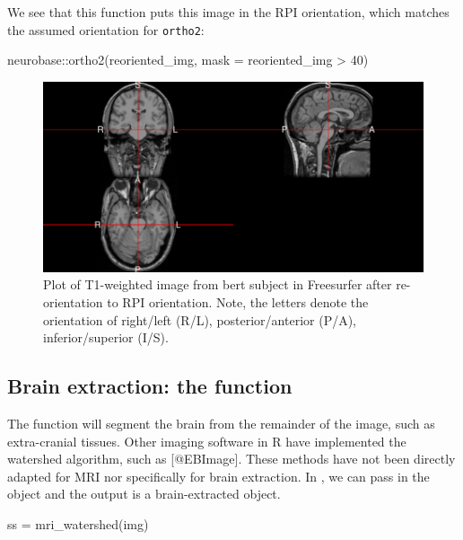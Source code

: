 We see that this function puts this image in the RPI orientation, which
matches the assumed orientation for \texttt{ortho2}:

\begin{Schunk}
\begin{Sinput}
neurobase::ortho2(reoriented_img, mask = reoriented_img > 40)
\end{Sinput}
\begin{figure}
\includegraphics{Freesurfer_files/figure-latex/mri_plot2-1} \caption[Plot of T1-weighted image from bert subject in Freesurfer after re-orientation to RPI orientation]{Plot of T1-weighted image from bert subject in Freesurfer after re-orientation to RPI orientation.  Note, the letters denote the orientation of right/left (R/L), posterior/anterior (P/A), inferior/superior (I/S). }\label{fig:mri_plot2}
\end{figure}
\end{Schunk}

\subsection{\texorpdfstring{Brain extraction: the 
function}{Brain extraction: the  function}}\label{brain-extraction-the-function}

The  function will segment the brain from the
remainder of the image, such as extra-cranial tissues. Other imaging
software in R have implemented the watershed algorithm, such as
 {[}@EBImage{]}. These methods have not been directly
adapted for MRI nor specifically for brain extraction. In
, we can pass in the  object and the output
is a brain-extracted  object.

\begin{Schunk}
\begin{Sinput}
ss = mri_watershed(img)
\end{Sinput}
\end{Schunk}

